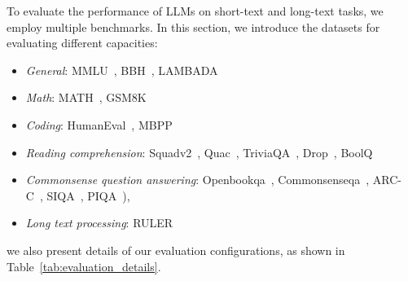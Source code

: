 To evaluate the performance of LLMs on short-text and long-text tasks, we employ multiple benchmarks. In this section, we introduce the datasets for evaluating different capacities:
\begin{itemize}
    \item \emph{General}: MMLU~\cite{Hendrycks-iclr-2021-mmlu}, BBH~\cite{suzgun-acl-2023-bbh}, LAMBADA~\cite{paperno-acl-2016-lambada}
    \item \emph{Math}: MATH~\cite{henderycksnips-2021-math}, GSM8K~\cite{cobbe-arxiv-2021-gsm8k}
    \item \emph{Coding}: HumanEval~\cite{chen-arxiv-2021-humaneval}, MBPP~\cite{austin-arxiv-2021-mbpp}
    \item \emph{Reading comprehension}: Squadv2~\cite{rajpurkar-EMNLP-2016-squad}, Quac~\cite{choi-acl-2018-quac}, TriviaQA~\cite{Joshi-acl-2017-triviaqa}, Drop~\cite{dua-naacl-2019-drop}, BoolQ~\cite{clark-naccl-2019-boolq}
    \item \emph{Commonsense question answering}: Openbookqa~\cite{todor-emnlp-2018-openbookqa}, Commonsenseqa~\cite{talmor-naacl-2019-commonsenseqa}, ARC-C~\cite{clark-arxiv-2018-arc}, SIQA~\cite{Sap-emnlp-2019-siqa}, PIQA~\cite{bisk-aaai-2020-piqa}),
    \item \emph{Long text processing}: RULER~\cite{Hsieh-arxiv-2024-RULER}
\end{itemize}
we also present details of our evaluation configurations, as shown in Table~\ref{tab:evaluation_details}.

